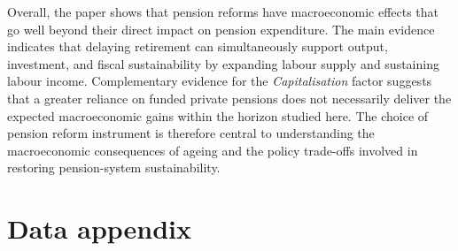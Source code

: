 \documentclass[11pt,english,a4paper, twoside, authoryear]{article}
\begin{document}
Overall, the paper shows that pension reforms have macroeconomic effects that go well beyond their direct impact on pension expenditure. The main evidence indicates that delaying retirement can simultaneously support output, investment, and fiscal sustainability by expanding labour supply and sustaining labour income. Complementary evidence  for the \emph{Capitalisation} factor suggests that  a greater reliance on funded private pensions does not necessarily deliver the expected macroeconomic gains within the horizon studied here. The choice of pension reform instrument is therefore central to understanding the macroeconomic consequences of ageing and the policy trade-offs involved in restoring pension-system sustainability.



\clearpage

%






\setcounter{table}{0}
\renewcommand{\thefigure}{A.\arabic{figure}}
\renewcommand{\thetable}{A.\arabic{table}}




\clearpage


\appendix

\renewcommand{\thefigure}{\thesection.\arabic{figure}}


\section{Data appendix}\label{sec: OAData}
\end{document}
